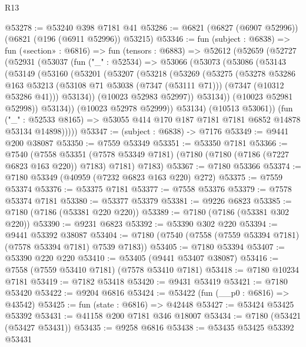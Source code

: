 \begin{lexlean}{R13}
\begin{coremodule}
@53278 := @53240 @398 @7181 @41
@53286 := @6821 (@6827 (@6907 @52996)) (@6821 (@196 (@6911 @52996)) @53215)
@53346 := fun (subject : @6838) =>
  fun («section» : @6816) =>
  fun (tensors : @6883) =>
  @52612
    (@52659
      (@52727
        (@52931
          (@53037
            (fun ("_" : @52534) =>
            @53066
              (@53073
                (@53086
                  (@53143
                    (@53149
                      (@53160
                        (@53201
                          (@53207
                            (@53218
                              (@53269
                                (@53275
                                  (@53278
                                    @53286
                                    @163
                                    @53213
                                    (@53108 @71 @53038 (@7347 (@53111 @71)))
                                    (@7347 (@10312 @53286 @41)))
                                  @53134))
                              (@10023 @52983 @52997))
                            @53134))
                        (@10023 @52981 @52998))
                      @53134))
                  (@10023 @52978 @52999))
                @53134)
              (@10513 @53061))
            (fun ("_" : @52533 @8165) =>
            @53055 @414 @170 @187 @7181 @7181 @6852 @14878 @53134 @14898)))))
@53347 := (subject : @6838) -> @7176
@53349 := @9441 @200 @38087
@53350 := @7559 @53349
@53351 := @53350 @7181
@53366 := @7540
    (@7558
      @53351
      (@7578 @53349 @7181)
      (@7180 (@7180 (@7186 (@7227 @6823 @163 @220)) @7183) @7181)
      @7183)
@53367 := @7180 @53366
@53374 := @7180 @53349 (@40959 (@7232 @6823 @163 @220) @272)
@53375 := @7559 @53374
@53376 := @53375 @7181
@53377 := @7558 @53376
@53379 := @7578 @53374 @7181
@53380 := @53377 @53379
@53381 := @9226 @6823
@53385 := @7180 (@7186 (@53381 @220 @220))
@53389 := @7180 (@7186 (@53381 @302 @220))
@53390 := @9231 @6823
@53392 := @53390 @302 @220
@53394 := @9441 @53392 @38087
@53404 := @7180 (@7540 (@7558 (@7559 @53394 @7181) (@7578 @53394 @7181) @7539 @7183))
@53405 := @7180 @53394
@53407 := @53390 @220 @220
@53410 := @53405 (@9441 @53407 @38087)
@53416 := @7558 (@7559 @53410 @7181) (@7578 @53410 @7181)
@53418 := @7180 @10234 @7181
@53419 := @7182 @53418
@53420 := @9431 @53419
@53421 := @7180 @53420
@53422 := @9204 @6816
@53424 := @53422 (fun (__p0 : @6816) => @43542)
@53425 := fun (state : @6816) => @42448
@53427 := @53424 @53425 @53392
@53431 := @41158 @200 @7181 @346 @18007
@53434 := @7180 (@53421 (@53427 @53431))
@53435 := @9258 @6816
@53438 := @53435 @53425 @53392 @53431

\end{coremodule}
\end{lexlean}
